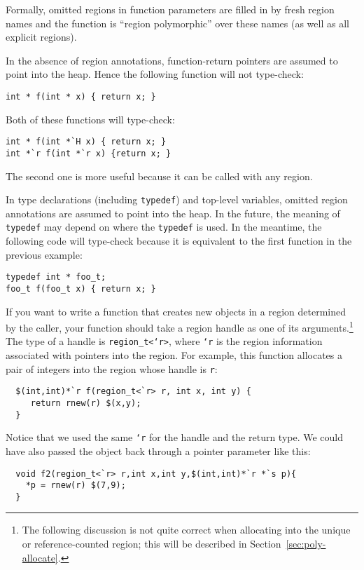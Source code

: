 Formally, omitted regions in function parameters are filled in by
fresh region names and the function is ``region polymorphic'' over
these names (as well as all explicit regions).

In the absence of region annotations, function-return pointers are
assumed to point into the heap.  Hence the following function will not
type-check:
\begin{verbatim}
int * f(int * x) { return x; }
\end{verbatim}
Both of these functions will type-check:
\begin{verbatim}
int * f(int *`H x) { return x; }
int *`r f(int *`r x) {return x; }
\end{verbatim}
The second one is more useful because it can be called with any
region.

In type declarations (including \texttt{typedef}) and top-level variables,
omitted region annotations are assumed to point into the heap.  In the
future, the meaning of \texttt{typedef} may depend on where the
\texttt{typedef} is used.  In the meantime, the following code will
type-check because it is equivalent to the first function in the previous
example:
\begin{verbatim}
typedef int * foo_t;
foo_t f(foo_t x) { return x; }
\end{verbatim}


If you want to write a function that creates new objects in a region
determined by the caller, your function should take a region handle as one
of its arguments.\footnote{The following discussion is not quite correct when
allocating into the unique or reference-counted region; this will be
described in Section~\ref{sec:poly-allocate}.}  The type of a handle is
\texttt{region_t<`r>}, where \texttt{`r} is the region information
associated with pointers into the region.  For example, this function
allocates a pair of integers into the region whose handle is \texttt{r}:
\begin{verbatim}
  $(int,int)*`r f(region_t<`r> r, int x, int y) { 
     return rnew(r) $(x,y);
  }
\end{verbatim}
Notice that we used the same \texttt{`r} for the handle and the return
type.  We could have also passed the object back through a pointer
parameter like this:
\begin{verbatim}
  void f2(region_t<`r> r,int x,int y,$(int,int)*`r *`s p){ 
    *p = rnew(r) $(7,9); 
  }
\end{verbatim}

